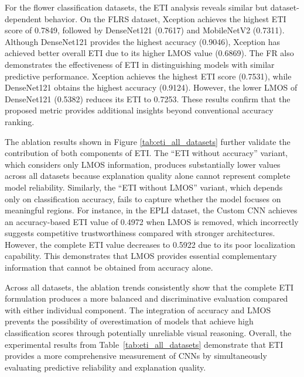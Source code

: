 \documentclass[a4paper,fleqn]{cas-dc}
\begin{document}
For the flower classification datasets, the ETI analysis reveals similar but dataset-dependent behavior. On the FLRS dataset, Xception achieves the highest ETI score of 0.7849, followed by DenseNet121 (0.7617) and MobileNetV2 (0.7311). Although DenseNet121 provides the highest accuracy (0.9046), Xception has achieved better overall ETI due to its higher LMOS value (0.6869). The FR also demonstrates the effectiveness of ETI in distinguishing models with similar predictive performance. Xception achieves the highest ETI score (0.7531), while DenseNet121 obtains the highest accuracy (0.9124). However, the lower LMOS of DenseNet121 (0.5382) reduces its ETI to 0.7253. These results confirm that the proposed metric provides additional insights beyond conventional accuracy ranking.

The ablation results shown in Figure \ref{tab:eti_all_datasets} further validate the contribution of both components of ETI. The ``ETI without accuracy'' variant, which considers only LMOS information, produces substantially lower values across all datasets because explanation quality alone cannot represent complete model reliability. Similarly, the ``ETI without LMOS'' variant, which depends only on classification accuracy, fails to capture whether the model focuses on meaningful regions. For instance, in the EPLI dataset, the Custom CNN achieves an accuracy-based ETI value of 0.4972 when LMOS is removed, which incorrectly suggests competitive trustworthiness compared with stronger architectures. However, the complete ETI value decreases to 0.5922 due to its poor localization capability. This demonstrates that LMOS provides essential complementary information that cannot be obtained from accuracy alone.

Across all datasets, the ablation trends consistently show that the complete ETI formulation produces a more balanced and discriminative evaluation compared with either individual component. The integration of accuracy and LMOS prevents the possibility of overestimation of models that achieve high classification scores through potentially unreliable visual reasoning. Overall, the experimental results from Table~\ref{tab:eti_all_datasets} demonstrate that ETI provides a more comprehensive measurement of CNNs by simultaneously evaluating predictive reliability and explanation quality.
\\
\end{document}
